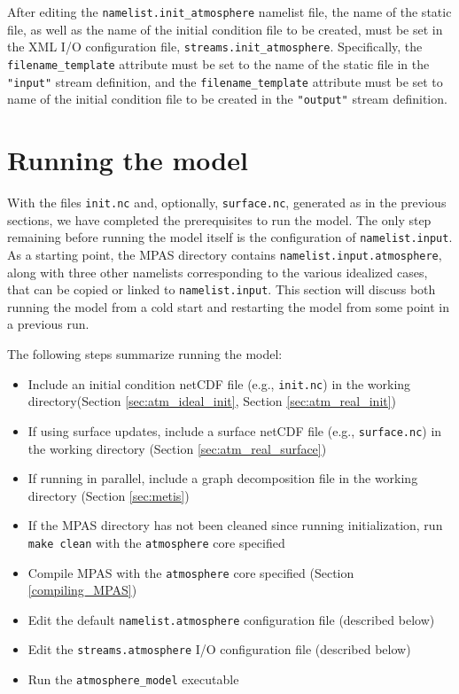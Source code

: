 After editing the {\tt namelist.init\_atmosphere} namelist file, the name of the static file, as well as the name of the initial condition file to be created, must be set in the XML I/O configuration file, {\tt streams.init\_atmosphere}. Specifically, the {\tt filename\_template} attribute must be set to the name of the static file in the {\tt "input"} stream definition, and the {\tt filename\_template} attribute must be set to name of the initial condition file to be created in the {\tt "output"} stream definition.

\section{Running the model}
\label{sec:atm_model_run}

With the files {\tt init.nc} and, optionally, {\tt surface.nc}, generated as in the previous sections, we have completed the prerequisites to run the model.  The only step remaining before running the model itself is the configuration of {\tt namelist.input}.  As a starting point, the MPAS directory contains {\tt namelist.input.atmosphere}, along with three other namelists corresponding to the various idealized cases, that can be copied or linked to {\tt namelist.input}.  This section will discuss both running the model from a cold start and restarting the model from some point in a previous run.

The following steps summarize running the model:

\begin{itemize}
\item Include an initial condition netCDF file (e.g., {\tt init.nc}) in the working directory(Section \ref{sec:atm_ideal_init}, Section \ref{sec:atm_real_init})
\item If using surface updates, include a surface netCDF file (e.g., {\tt surface.nc}) in the working directory (Section \ref{sec:atm_real_surface})
\item If running in parallel, include a graph decomposition file in the working directory (Section \ref{sec:metis})
\item If the MPAS directory has not been cleaned since running initialization, run {\tt make clean} with the {\tt atmosphere} core specified
\item Compile MPAS with the {\tt atmosphere} core specified (Section \ref{compiling_MPAS})
\item Edit the default {\tt namelist.atmosphere} configuration file (described below)
\item Edit the {\tt streams.atmosphere} I/O configuration file (described below)
\item Run the {\tt atmosphere\_model} executable
\end{itemize}

